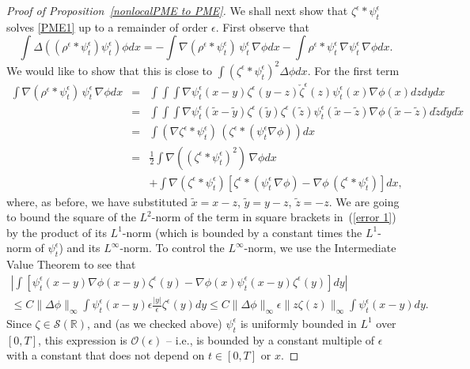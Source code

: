\documentclass[EJP]{ejpecp} %
\renewcommand{\tilde}{\widetilde}
\newcommand{\IR}{\mathbb R}
\begin{document}
\begin{proof}[Proof of Proposition~\ref{nonlocalPME to PME}]
We shall next show that $\zeta^\epsilon * \psi_t^\epsilon$ solves \eqref{PME1}
up to a remainder of order $\epsilon$.
First observe that
\begin{equation}
\label{total equation}
\int\Delta\left((\rho^{\epsilon}*\psi_t^\epsilon)\psi_t^\epsilon\right)\phi  dx
    =
    - \int \nabla(\rho^{\epsilon}*\psi_t^\epsilon)\, \psi_t^\epsilon\,\nabla\phi dx
    -\int \rho^{\epsilon}*\psi_t^\epsilon \,\nabla \psi_t^\epsilon \, \nabla\phi dx.
\end{equation}
We would like to show that this is close to $\int (\zeta^\epsilon * \psi^\epsilon_t)^2 \Delta \phi dx$.
For the first term
\begin{eqnarray}
\nonumber
\int \nabla(\rho^{\epsilon}*\psi_t^\epsilon)\, \psi_t^\epsilon\, \nabla\phi  dx
&=&
\int\int\int\nabla \psi_t^\epsilon(x-y)\zeta^{\epsilon}(y-z)
\check{\zeta}^{\epsilon}(z)
\psi_t^\epsilon(x)\nabla\phi(x) dz  dy  dx
\\
\nonumber
&=&
\int\int\int\nabla \psi_t^\epsilon(\tilde{x}-\tilde{y})
\zeta^{\epsilon}(\tilde{y})
\zeta^{\epsilon}(\tilde{z})\psi_t^\epsilon(\tilde{x}-\tilde{z})
\nabla\phi(\tilde{x}-\tilde{z}) d\tilde{z} d\tilde{y} d\tilde{x}
\\
\nonumber
&=&\int(\nabla \zeta^{\epsilon}*\psi_t^\epsilon)\,
\left(\zeta^{\epsilon}*(\psi_t^\epsilon\nabla\phi)\right)
d x\\
\nonumber
&=&
\frac{1}{2}\int\nabla ((\zeta^{\epsilon}*\psi_t^\epsilon)^2)
\,\nabla\phi  dx
\\
\label{error 1}
&&+
\int\nabla(\zeta^{\epsilon}*\psi_t^\epsilon)
\left[\zeta^{\epsilon}*(\psi_t^\epsilon\,\nabla\phi)-
\nabla\phi\,(\zeta^{\epsilon}*\psi_t^\epsilon)\right] dx,
\end{eqnarray}
where, as before, we have substituted $\tilde{x}=x-z$, $\tilde{y}=y-z$,
$\tilde{z}=-z$.
We are going to bound the square of the $L^2$-norm of the term in square brackets 
in~(\ref{error 1}) by the product of its $L^1$-norm (which is bounded
by a constant times the $L^1$-norm of $\psi_t^\epsilon$) and its $L^\infty$-norm.
To control the $L^\infty$-norm,
we use the Intermediate Value Theorem to see that
\begin{multline*}
\left|\int\left[\psi_t^\epsilon(x-y)\nabla\phi(x-y)\zeta^{\epsilon}(y)-
\nabla\phi(x)\psi_t^\epsilon(x-y)\zeta^{\epsilon}(y)
\right] dy\right|
\\
	\leq C\|\Delta\phi\|_\infty\int \psi_t^\epsilon (x-y)
	\epsilon\frac{|y|}{\epsilon}\zeta^{\epsilon}(y) d y
	\leq C\|\Delta\phi\|_\infty\epsilon \|z\zeta(z)\|_\infty\int \psi_t^\epsilon (x-y) dy.
\end{multline*}
Since $\zeta\in\mathcal{S}(\IR)$,
and (as we checked above)
$\psi_t^\epsilon$ is uniformly bounded in $L^1$ over $[0,T]$,
this expression is $\mathcal{O}(\epsilon)$ -- 
i.e., is bounded by a constant multiple of $\epsilon$
with a constant that does not depend on $t \in [0,T]$ or $x$.


\end{proof}
\end{document}

